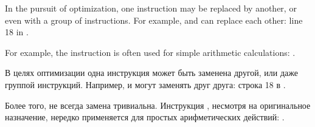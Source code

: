 \chapterold{\ArithOptimizations}

\ifdefined\ENGLISH
In the pursuit of optimization, one instruction may be replaced by another, or even with a group of instructions.
For example, \ADD and \SUB can replace each other:
line 18 in .

For example, the \LEA instruction is often used for simple arithmetic calculations: .
\fi %

\ifdefined\RUSSIAN
В целях оптимизации одна инструкция может быть заменена другой, или даже группой инструкций.
Например, \ADD и \SUB могут заменять друг друга:
строка 18 в .

Более того, не всегда замена тривиальна. Инструкция \LEA, несмотря на оригинальное назначение, нередко применяется для простых арифметических действий: .
\fi %

\EN{}
\RU{}
\EN{}
\RU{}

